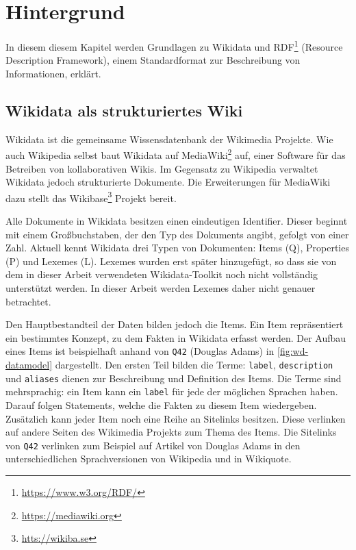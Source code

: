 %
\chapter{Hintergrund}
\label{sec:concepts}
In diesem diesem Kapitel werden Grundlagen zu Wikidata und RDF\footnote{\url{https://www.w3.org/RDF/}} (Resource Description Framework), einem Standardformat zur Beschreibung von Informationen, erklärt. 

\section{Wikidata als strukturiertes Wiki}
Wikidata ist die gemeinsame Wissensdatenbank der Wikimedia Projekte.
Wie auch Wikipedia selbst baut Wikidata auf MediaWiki\footnote{\url{https://mediawiki.org}} auf, einer Software für das Betreiben von kollaborativen Wikis.
Im Gegensatz zu Wikipedia verwaltet Wikidata jedoch strukturierte Dokumente.
Die Erweiterungen für MediaWiki dazu stellt das Wikibase\footnote{\url{htts://wikiba.se}} Projekt bereit.

Alle Dokumente in Wikidata besitzen einen eindeutigen Identifier.
Dieser beginnt mit einem Großbuchstaben, der den Typ des Dokuments angibt, gefolgt von einer Zahl.
Aktuell kennt Wikidata drei Typen von Dokumenten: Items (Q), Properties (P) und Lexemes (L).
Lexemes wurden erst später hinzugefügt, so dass sie von dem in dieser Arbeit verwendeten Wikidata-Toolkit noch nicht vollständig unterstützt werden.
In dieser Arbeit werden Lexemes daher nicht genauer betrachtet.

Den Hauptbestandteil der Daten bilden jedoch die Items.
Ein Item repräsentiert ein bestimmtes Konzept, zu dem Fakten in Wikidata erfasst werden.
Der Aufbau eines Items ist beispielhaft anhand von \verb|Q42| (Douglas Adams) in \cref{fig:wd-datamodel} dargestellt.
Den ersten Teil bilden die Terme: \verb|label|, \verb|description| und \verb|aliases| dienen zur Beschreibung und Definition des Items.
Die Terme sind mehrsprachig: ein Item kann ein \verb|label| für jede der möglichen Sprachen haben.
Darauf folgen Statements, welche die Fakten zu diesem Item wiedergeben.
Zusätzlich kann jeder Item noch eine Reihe an Sitelinks besitzen. 
Diese verlinken auf andere Seiten des Wikimedia Projekts zum Thema des Items.
Die Sitelinks von \verb|Q42| verlinken zum Beispiel auf Artikel von Douglas Adams in den unterschiedlichen Sprachversionen von Wikipedia und in Wikiquote.

